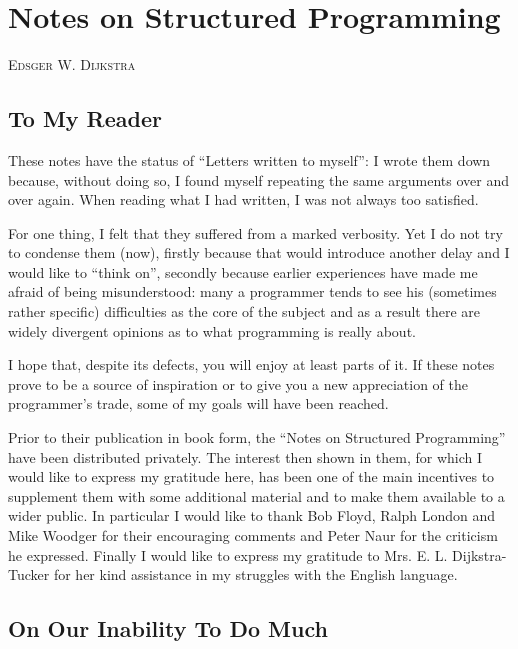 \chapter{Notes on Structured Programming}

{
	\noindent
	\scshape\hfill\scriptsize Edsger W. Dijkstra\hfill
}
\renewcommand{\leftmark}{\normalfont\scriptsize\hfill E. W. DIJKSTRA\hfill}
\medskip

\section[To my reader]{To My Reader}

These notes have the status of ``Letters written to myself'': I wrote them down because, without doing so, I found myself repeating the same arguments over and over again. When reading what I had written, I was not always too satisfied.

For one thing, I felt that they suffered from a marked verbosity. Yet I do not try to condense them (now), firstly because that would introduce another delay and I would like to ``think on'', secondly because earlier experiences have made me afraid of being misunderstood: many a programmer tends to see his (sometimes rather specific) difficulties as the core of the subject and as a result there are widely divergent opinions as to what programming is really about.

I hope that, despite its defects, you will enjoy at least parts of it. If these notes prove to be a source of inspiration or to give you a new appreciation of the programmer's trade, some of my goals will have been reached.

Prior to their publication in book form, the ``Notes on Structured Programming'' have been distributed privately. The interest then shown in
them, for which I would like to express my gratitude here, has been one of the main incentives to supplement them with some additional material and to make them available to a wider public. In particular I would like to thank Bob Floyd, Ralph London and Mike Woodger for their encouraging
comments and Peter Naur for the criticism he expressed. Finally I would like to express my gratitude to Mrs. E. L. Dijkstra-Tucker for her kind
assistance in my struggles with the English language.

\section[On our inability to do much]{On Our Inability To Do Much}
\label{sec:our-inability-to-do-much}

